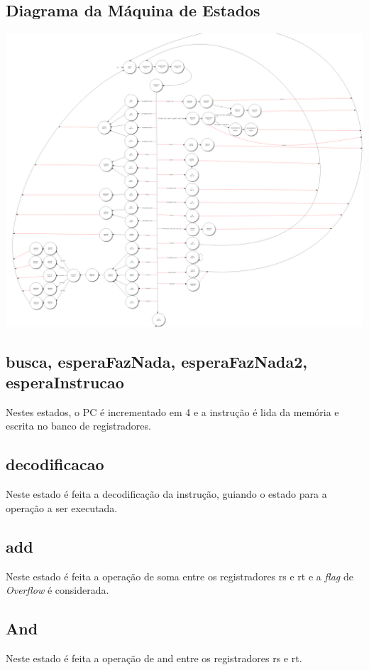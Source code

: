 \documentclass{article}
\begin{document}
    \subsection{Diagrama da Máquina de Estados}
        \begin{center}
            \includegraphics[scale=0.16]{FSM.png}
        \end{center}
    
    \newpage
    \subsection{busca, esperaFazNada, esperaFazNada2, esperaInstrucao}
    Nestes estados, o PC é incrementado em 4 e a instrução é lida da memória e escrita no banco de registradores.
    
    \subsection{decodificacao}
    Neste estado é feita a decodificação da instrução, guiando o estado para a operação a ser executada.
    
    \subsection{add}
    Neste estado é feita a operação de soma entre os registradores rs e rt e a {\it flag} de {\it Overflow} é considerada.
    
    \subsection{And}
    Neste estado é feita a operação de and entre os registradores rs e rt.
    
\end{document}
